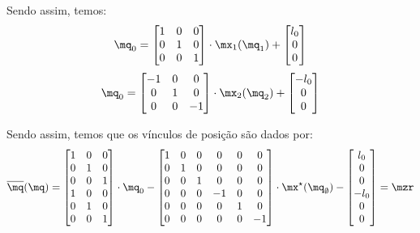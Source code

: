 \documentclass[]{politex}
\begin{document}
Sendo assim, temos:
\begin{equation}
\mq_0 = 
\begin{bmatrix}
1 & 0 & 0 \\
0 & 1 & 0 \\
0 & 0 & 1 \\
\end{bmatrix}
\cdot
\mx_1(\mq_1)
+
\begin{bmatrix}
l_0 \\
0 \\
0 \\
\end{bmatrix}
\end{equation}
\begin{equation}
\mq_0 = 
\begin{bmatrix}
-1 & 0 & 0 \\
0 & 1 & 0 \\
0 & 0 & -1 \\
\end{bmatrix}
\cdot
\mx_2(\mq_2)
+
\begin{bmatrix}
-l_0 \\
0 \\
0 \\
\end{bmatrix}
\end{equation}

Sendo assim, temos que os vínculos de posição são dados por:
\begin{equation}
\overline{\mq}(\mq) =
\begin{bmatrix}
1 & 0 & 0 \\
0 & 1 & 0 \\
0 & 0 & 1 \\
1 & 0 & 0 \\
0 & 1 & 0 \\
0 & 0 & 1 \\
\end{bmatrix}
\cdot
\mq_0
-
\begin{bmatrix}
1 & 0 & 0 & 0 & 0 & 0 \\
0 & 1 & 0 & 0 & 0 & 0 \\
0 & 0 & 1 & 0 & 0 & 0 \\
0 & 0 & 0 & -1 & 0 & 0 \\
0 & 0 & 0 & 0 & 1 & 0 \\
0 & 0 & 0 & 0 & 0 & -1 \\
\end{bmatrix}
\cdot
\mx^\star(\mq_\emptyset)
-
\begin{bmatrix}
l_0 \\
0 \\
0 \\
-l_0 \\
0 \\
0 \\
\end{bmatrix}
= \mzr
\end{equation}
\end{document}
